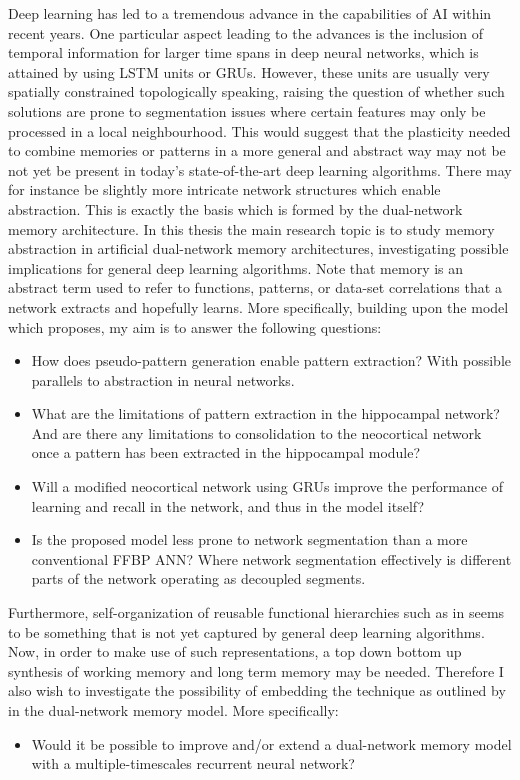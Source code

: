Deep learning has led to a tremendous advance in the capabilities of AI within recent years. One particular aspect leading to the advances is the inclusion of temporal information for larger time spans in deep neural networks, which is attained by using LSTM units or GRUs. However, these units are usually very spatially constrained topologically speaking, raising the question of whether such solutions are prone to segmentation issues where certain features may only be processed in a local neighbourhood. This would suggest that the plasticity needed to combine memories or patterns in a more general and abstract way may not be not yet be present in today's state-of-the-art deep learning algorithms. There may for instance be slightly more intricate network structures which enable abstraction. This is exactly the basis which is formed by the dual-network memory architecture. 
In this thesis the main research topic is to study memory abstraction in artificial dual-network memory architectures, investigating possible implications for general deep learning algorithms. Note that memory is an abstract term used to refer to functions, patterns, or data-set correlations that a network extracts and hopefully learns. More specifically, building upon the model which \cite{Hattori2014} proposes, my aim is to answer the following questions:
\begin{itemize}
\item How does pseudo-pattern generation enable pattern extraction? With possible parallels to abstraction in neural networks.
\item What are the limitations of pattern extraction in the hippocampal network? And are there any limitations to consolidation to the neocortical network once a pattern has been extracted in the hippocampal module?
\item Will a modified neocortical network using GRUs improve the performance of learning and recall in the network, and thus in the model itself?
\item Is the proposed model less prone to network segmentation than a more conventional FFBP ANN? Where network segmentation effectively is different parts of the network operating as decoupled segments.
\end{itemize}

Furthermore, self-organization of reusable functional hierarchies such as in \citep{Tani2014} seems to be something that is not yet captured by general deep learning algorithms. Now, in order to make use of such representations, a top down bottom up synthesis of working memory and long term memory may be needed. Therefore I also wish to investigate the possibility of embedding the technique as outlined by \cite{Tani2014} in the dual-network memory model. More specifically:
\begin{itemize}
\item Would it be possible to improve and/or extend a dual-network memory model with a multiple-timescales recurrent neural network?
\end{itemize}


